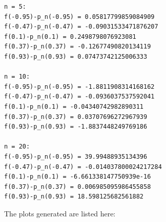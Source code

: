 \documentclass[UTF8,hyperref]{article}
\begin{document}
\begin{lstlisting}
n = 5:
f(-0.95)-p_n(-0.95) = 0.05817799859084909
f(-0.47)-p_n(-0.47) = -0.09031533471876207
f(0.1)-p_n(0.1) = 0.2498798076923081
f(0.37)-p_n(0.37) = -0.12677490820134119
f(0.93)-p_n(0.93) = 0.07473742125006333

n = 10:
f(-0.95)-p_n(-0.95) = -1.8811908314168162
f(-0.47)-p_n(-0.47) = -0.0936037537592041
f(0.1)-p_n(0.1) = -0.04340742982890311
f(0.37)-p_n(0.37) = 0.03707696272967939
f(0.93)-p_n(0.93) = -1.8837448249769186

n = 20:
f(-0.95)-p_n(-0.95) = 39.99488935134396
f(-0.47)-p_n(-0.47) = -0.014037800024217284
f(0.1)-p_n(0.1) = -6.661338147750939e-16
f(0.37)-p_n(0.37) = 0.006985095986455858
f(0.93)-p_n(0.93) = 18.598125682561882
\end{lstlisting}
\par The plots generated are listed here:
\end{document}
